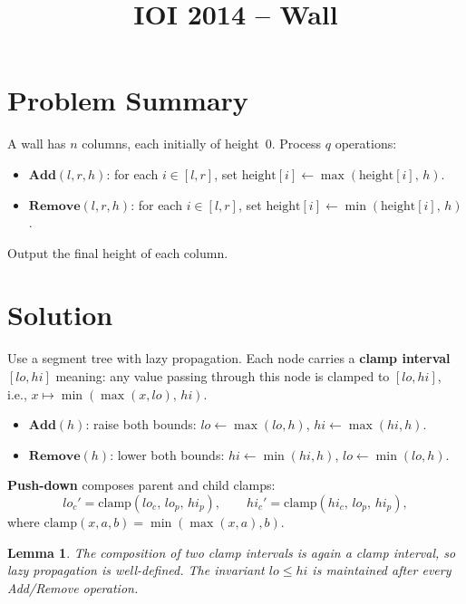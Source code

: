 \documentclass[11pt,a4paper]{article}
\title{IOI 2014 -- Wall}
\author{}
\date{}
\newtheorem{lemma}[theorem]{Lemma}
\begin{document}
\maketitle

\section{Problem Summary}

A wall has $n$ columns, each initially of height~0. Process $q$ operations:
\begin{itemize}
  \item $\textbf{Add}(l, r, h)$: for each $i \in [l, r]$, set $\text{height}[i] \gets \max(\text{height}[i],\, h)$.
  \item $\textbf{Remove}(l, r, h)$: for each $i \in [l, r]$, set $\text{height}[i] \gets \min(\text{height}[i],\, h)$.
\end{itemize}
Output the final height of each column.

\section{Solution}

Use a segment tree with lazy propagation. Each node carries a \textbf{clamp interval} $[\mathit{lo}, \mathit{hi}]$ meaning: any value passing through this node is clamped to $[\mathit{lo}, \mathit{hi}]$, i.e., $x \mapsto \min(\max(x, \mathit{lo}),\, \mathit{hi})$.

\begin{itemize}
  \item $\textbf{Add}(h)$: raise both bounds: $\mathit{lo} \gets \max(\mathit{lo}, h)$, $\mathit{hi} \gets \max(\mathit{hi}, h)$.
  \item $\textbf{Remove}(h)$: lower both bounds: $\mathit{hi} \gets \min(\mathit{hi}, h)$, $\mathit{lo} \gets \min(\mathit{lo}, h)$.
\end{itemize}

\textbf{Push-down} composes parent and child clamps:
\[
  \mathit{lo}_c' = \mathrm{clamp}(\mathit{lo}_c,\, \mathit{lo}_p,\, \mathit{hi}_p), \qquad
  \mathit{hi}_c' = \mathrm{clamp}(\mathit{hi}_c,\, \mathit{lo}_p,\, \mathit{hi}_p),
\]
where $\mathrm{clamp}(x, a, b) = \min(\max(x, a), b)$.

\begin{lemma}
The composition of two clamp intervals is again a clamp interval, so lazy propagation is well-defined. The invariant $\mathit{lo} \le \mathit{hi}$ is maintained after every Add/Remove operation.
\end{lemma}
\end{document}
